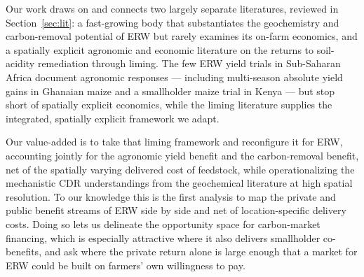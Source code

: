 \documentclass[12pt]{article}
\begin{document}
Our work draws on and connects two largely separate literatures, reviewed in
Section~\ref{sec:lit}: a fast-growing body that substantiates the geochemistry
and carbon-removal potential of ERW but rarely examines its on-farm economics,
and a spatially explicit agronomic and economic literature on the returns to
soil-acidity remediation through liming. The few ERW yield trials in Sub-Saharan
Africa document agronomic responses --- including multi-season absolute yield
gains in Ghanaian maize \citep{oppongdanso2025,akortey2026} and a smallholder
maize trial in Kenya \citep{haque2025} --- but stop short of spatially explicit
economics, while the liming literature
\citep{vascosilva2025,hijbeek2021} supplies the integrated, spatially explicit
framework we adapt.

Our value-added is to take that liming framework and reconfigure it for ERW,
accounting jointly for the agronomic yield benefit and the carbon-removal
benefit, net of the spatially varying delivered cost of feedstock, while
operationalizing the mechanistic CDR understandings from the geochemical
literature at high spatial resolution. To our knowledge this is the first
analysis to map the private and public benefit streams of ERW side by side and
net of location-specific delivery costs. Doing so lets us delineate the
opportunity space for carbon-market financing, which is especially attractive
where it also delivers smallholder co-benefits, and ask where the private return
alone is large enough that a market for ERW could be built on farmers' own
willingness to pay.
\end{document}
